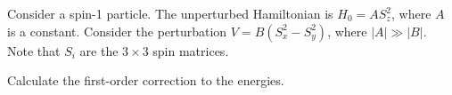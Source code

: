 \newcommand{\Ho}{H_0}
\newcommand{\Sx}{S_x}
\newcommand{\Sy}{S_y}
\newcommand{\Sz}{S_z}

\newcommand{\lam}{\lambda}

\newcommand{\suo}{^{(0)}}

\newcommand{\Eon}{E\suo_n}
\newcommand{\Eoq}{E\suo_1}
\newcommand{\Eow}{E\suo_2}
\newcommand{\Eoe}{E\suo_3}

\newcommand{\Eqn}{E^{(1)}_n}
\newcommand{\Eqq}{E^{(1)}_1}
\newcommand{\Eqw}{E^{(1)}_2}
\newcommand{\Eqe}{E^{(1)}_3}

\newcommand{\kon}{\ket*{n\suo}}
\newcommand{\koq}{\ket*{1\suo}}
\newcommand{\kow}{\ket*{2\suo}}
\newcommand{\koe}{\ket*{3\suo}}

\newcommand{\kpq}{\ket{+1}}
\newcommand{\ko}{\ket{0}}
\newcommand{\kmq}{\ket{-1}}

\newcommand{\Deln}{\Delta^{(1)}_n}
\newcommand{\Delq}{\Delta^{(1)}_1}
\newcommand{\Delw}{\Delta^{(1)}_2}
\newcommand{\Dele}{\Delta^{(1)}_3}

\newcommand{\Po}{P_0}
\newcommand{\Vo}{V_0}
\newcommand{\sigx}{\sigma_x}

\begin{statement}{}
	Consider a spin-1 particle.  The unperturbed Hamiltonian is $\Ho = A \Sz^2$, where $A$ is a constant.  Consider the perturbation $V = B(\Sx^2 - \Sy^2)$, where $|A| \gg |B|$.  Note that $S_i$ are the $3 \times 3$ spin matrices.
\end{statement}

\begin{problem} \label{1a}
	Calculate the first-order correction to the energies.
\end{problem}

